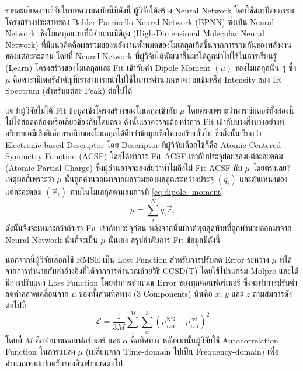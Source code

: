 รายละเอียดงานวิจัยในบทความฉบับนี้มีดังนี้ ผู้วิจัยได้สร้าง Neural Network โดยใช้สถาปัตยกรรมโครงสร้างประสาทของ Behler-Parrinello Neural Network (BPNN)\autocite{behler2007,behler2011b,behler2015} ซึ่งเป็น Neural Network เชิงโมเลกุลแบบที่มีจำนวนมิติสูง (High-Dimensional Molecular Neural Network) ที่มีแนวคิดคือผลรวมของพลังงานทั้งหมดของโมเลกุลเกิดขึ้นจากการรวมกันของพลังงานของแต่ละอะตอม โดยที่ Neural Network ที่ผู้วิจัยได้พัฒนาขึ้นมาได้ถูกนำไปใช้ในการเรียนรู้ (Learn) โครงสร้างของโมเลกุลและ Fit เข้ากับค่า Dipole Moment $(\mu)$ ของโมเลกุลนั้น ๆ ซึ่ง $\mu$ คือพารามิเตอร์สำคัญที่เราสามารถนำไปใช้ในการคำนวณหาความเข้มหรือ Intensity ของ IR Spectrum (สำหรับแต่ละ Peak) ต่อไปได้

แต่ว่าผู้วิจัยไม่ได้ Fit ข้อมูลเชิงโครงสร้างของโมเลกุลเข้ากับ $\mu$ โดยตรงเพราะว่าพารามิเตอร์ทั้งสองนี้ไม่ได้สอดคล้องหรือเกี่ยวข้องกันโดยตรง ดังนั้นเราควรจะต้องทำการ Fit เข้ากับบางสิ่งบางอย่างที่อธิบายเคมีเชิงอิเล็กทรอนิกของโมเลกุลได้ดีกว่าข้อมูลเชิงโครงสร้างทั่วไป ซึ่งสิ่งนั้นเรียกว่า Electronic-based Descriptor โดย Descriptor ที่ผู้วิจัยเลือกใช้ก็คือ Atomic-Centered Symmetry Function (ACSF) โดยได้ทำการ Fit ACSF เข้ากับประจุย่อยของแต่ละอะตอม (Atomic Partial Charge) ซึ่งผู้อ่านอาจจะสงสัยว่าทำไมถึงไม่ Fit ACSF กับ $\mu$ โดยตรงเลย? เหตุผลก็เพราะว่า $\mu$ นั้นถูกคำนวณมาจากผลรวมของผลคูณระหว่างประจุ $(q_{i})$ และตำแหน่งของแต่ละอะตอม $(\vec{r}_{i})$ ภายในโมเลกุลตามสมการที่ \eqref{eq:dipole_moment}
%
\begin{equation}\label{eq:dipole_moment}
    \mu 
    = 
    \sum^{N}_{i} q_{i}\vec{r}_{i}
\end{equation}
%
\noindent ดังนั้นจึงจะเหมาะกว่าถ้าเรา Fit เข้ากับประจุก่อน หลังจากนั้นเอาต์พุตสุดท้ายที่ถูกทำนายออกมาจาก Neural Network นั้นก็จะเป็น $\mu$ นั่นเอง สรุปลำดับการ Fit ข้อมูลมีดังนี้


นอกจากนี้ผู้วิจัยเลือกใช้ RMSE เป็น Lost Function สำหรับการปรับลด Error ระหว่าง $\mu$ ที่ได้จากการทำนายกับค่าอ้างอิงที่ได้จากการคำนวณด้วยวิธี CCSD(T) โดยใช้โปรแกรม Molpro และได้มีการปรับแต่ง Loss Function โดยทำการคำนวณ Error ของทุกคอนฟอร์เมอร์ ซึ่งจะทำการปรับค่าลดค่าคลาดเคลื่อนจาก $\mu$ ของทั้งสามทิศทาง (3 Components) นั่นคือ $x$, $y$ และ $z$ ตามสมการดังต่อไปนี้
%
\begin{equation}
    \mathcal{L} 
    = 
    \frac{1}{3M} \sum^{M}_{i} \sum^{3}_{\alpha} (\mu^{\text{NN}}_{i,\alpha}
    - \mu^{\text{ref}}_{i,\alpha})^{2}
\end{equation}
%
\noindent โดยที่ $M$ คือจำนวนคอนฟอร์เมอร์ และ $\alpha$ คือทิศทาง หลังจากนั้นผู้วิจัยใช้ Autocorrelation Function ในการแปลง $\mu$ (เปลี่ยนจาก Time-domain ไปเป็น Frequency-domain) เพื่อคำนวณหาสเปกตรัมของอินฟราเรดต่อไป

